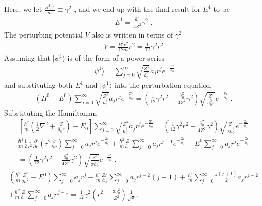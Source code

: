     \noindent Here, we let $\frac{B^2 e^2}{m} \equiv \gamma^2$ \cite{Killingbeck_1979}, and we end up with the final result for $E^1$ to be 
    \begin{align}
        E^1 = \frac{\bar{a}_0^2}{4Z^2} \gamma^2\;.
    \end{align}
    \noindent The perturbing potential $V$ also is written in terms of $\gamma^2$
    \begin{align}
        V = \frac{B^2 e^2}{12m} r^2 = \frac{1}{12} \gamma^2 r^2
    \end{align}
    \noindent Assuming that $\vert \psi^1 \rangle$ is of the form of a power series 
    \begin{align}
        \vert \psi^1 \rangle = \sum_{j = 0}^\infty \sqrt{\frac{Z^3}{\bar{a}_0^3}} a_j r^j e^{-\frac{Zr}{\bar{a}_0}}
    \end{align}
    \noindent and substituting both $E^1$ and $\vert \psi^1 \rangle$ into the perturbation equation
    \begin{align}
        \left(H^0 - E^0 \right) \sum_{j = 0}^\infty  \sqrt{\frac{Z^3}{\bar{a}_0^3}} a_j r^j e^{-\frac{Zr}{\bar{a}_0}} = \left( \frac{1}{12} \gamma^2 r^2 - \frac{\bar{a}_0^2}{4Z^2} \gamma^2 \right) \sqrt{\frac{Z^3}{\bar{a}_0^3 \pi}} e^{-\frac{Zr}{\bar{a}_0}}\;.
    \end{align}
    \noindent Substituting the Hamiltonian 
    \begin{align*}
        \left[ \frac{\hbar^2}{m} \left(\frac{1}{2}\nabla^2 + \frac{Z}{\bar{a}_0 r}\right) - E_0\right] \sum_{j = 0}^\infty \sqrt{\frac{Z^3}{\bar{a}_0^3}} a_j r^j e^{-\frac{Zr}{\bar{a_0}}} = \left( \frac{1}{12} \gamma^2 r^2 - \frac{\bar{a}_0^2}{4Z^2} \gamma^2 \right) \sqrt{\frac{Z^3}{\pi \bar{a}_0^3}} e^{-\frac{Zr}{\bar{a}_0}}
    \end{align*}
    \begin{align*}
        \frac{\hbar^2}{m}\frac{1}{2} \frac{1}{r^2} \frac{\partial}{\partial r} \left(r^2 \frac{\partial}{\partial r} \right) \sum_{j = 0}^\infty a_j r^j e^{-\frac{Zr}{\bar{a}_0}} + \frac{\hbar^2}{m}\frac{Z}{\bar{a}_0} \sum_{j = 0}^\infty a_j r^{j - 1} e^{-\frac{Zr}{\bar{a}_0}} - E^0 \sum_{j = 0}^\infty a_j r^j e^{-\frac{Zr}{\bar{a}_0}} \nonumber\\ = \left( \frac{1}{12} \gamma^2 r^2 - \frac{\bar{a}_0^2}{4Z^2} \gamma^2 \right) \sqrt{\frac{Z^3}{\pi \bar{a}_0^3}} e^{-\frac{Zr}{\bar{a}_0}}\;.
    \end{align*}
    \begin{align*}
        \left( \frac{\hbar^2}{m}\frac{Z^2}{2 \bar{a}_0^2} - E^0\right) \sum_{j = 0}^\infty a_j r^j - \frac{\hbar^2}{m}\frac{Zr}{\bar{a}_0} \sum_{j = 0}^\infty a_j r^{j -2} (j + 1) + \frac{\hbar^2}{m}\sum_{j = 0}^\infty \frac{j(j+1)}{2} a_j r^{j - 2} \nonumber\\+ \frac{\hbar^2}{m}\frac{Z}{\bar{a}_0} \sum_{j = 0}^\infty a_j r^{j -1} = \frac{1}{12} \gamma^2 \left(r^2 - \frac{3 \bar{a}_0^2}{Z^2} \right) \frac{1}{\sqrt{\pi}}.
    \end{align*}
